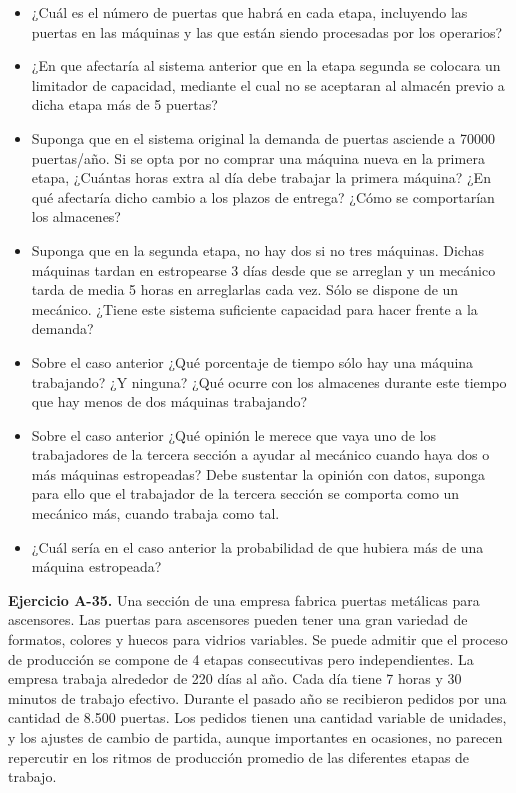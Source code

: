 \documentclass[
]{book}
\providecommand{\tightlist}{%
  \setlength{\itemsep}{0pt}\setlength{\parskip}{0pt}}
\theoremstyle{definition}
\theoremstyle{definition}
\theoremstyle{definition}
\theoremstyle{definition}
\theoremstyle{remark}
\begin{document}
\begin{itemize}
\tightlist
\item
  ¿Cuál es el número de puertas que habrá en cada etapa, incluyendo las puertas en las máquinas y las que están siendo procesadas por los operarios?
\item
  ¿En que afectaría al sistema anterior que en la etapa segunda se colocara un limitador de capacidad, mediante el cual no se aceptaran al almacén previo a dicha etapa más de 5 puertas?
\item
  Suponga que en el sistema original la demanda de puertas asciende a 70000 puertas/año. Si se opta por no comprar una máquina nueva en la primera etapa, ¿Cuántas horas extra al día debe trabajar la primera máquina? ¿En qué afectaría dicho cambio a los plazos de entrega? ¿Cómo se comportarían los almacenes?
\item
  Suponga que en la segunda etapa, no hay dos si no tres máquinas. Dichas máquinas tardan en estropearse 3 días desde que se arreglan y un mecánico tarda de media 5 horas en arreglarlas cada vez. Sólo se dispone de un mecánico. ¿Tiene este sistema suficiente capacidad para hacer frente a la demanda?
\item
  Sobre el caso anterior ¿Qué porcentaje de tiempo sólo hay una máquina trabajando? ¿Y ninguna? ¿Qué ocurre con los almacenes durante este tiempo que hay menos de dos máquinas trabajando?
\item
  Sobre el caso anterior ¿Qué opinión le merece que vaya uno de los trabajadores de la tercera sección a ayudar al mecánico cuando haya dos o más máquinas estropeadas? Debe sustentar la opinión con datos, suponga para ello que el trabajador de la tercera sección se comporta como un mecánico más, cuando trabaja como tal.
\item
  ¿Cuál sería en el caso anterior la probabilidad de que hubiera más de una máquina estropeada?
\end{itemize}

\textbf{Ejercicio A-35.} Una sección de una empresa fabrica puertas metálicas para ascensores. Las puertas para ascensores pueden tener una gran variedad de formatos, colores y huecos para vidrios variables.
Se puede admitir que el proceso de producción se compone de 4 etapas consecutivas pero independientes. La empresa trabaja alrededor de 220 días al año. Cada día tiene 7 horas y 30 minutos de trabajo efectivo. Durante el pasado año se recibieron pedidos por una cantidad de 8.500 puertas. Los pedidos tienen
una cantidad variable de unidades, y los ajustes de cambio de partida, aunque importantes en ocasiones, no parecen repercutir en los ritmos de producción promedio de las diferentes etapas de trabajo.
\end{document}
